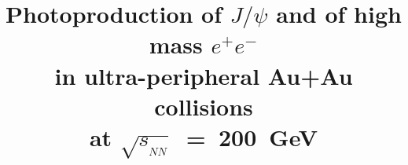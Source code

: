 \documentclass[dvipdfm]{elsart}
\newcommand{\sqrtsnn}{\sqrt{s_{_{NN}}}}
\def\ee{\mbox{$e^+e^-$}}
\providecommand{\jpsi}{J/\psi}
\begin{document}


\begin{frontmatter}


\title{Photoproduction of $\jpsi$ and of high mass $\ee$ \\
	in ultra-peripheral Au+Au collisions \\
	at $\sqrtsnn$~=~200~GeV}


\end{frontmatter}
\end{document}
